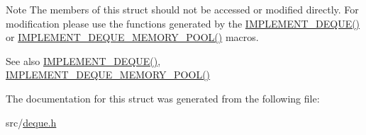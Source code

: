 \begin{DoxyNote}{Note}
The members of this struct should not be accessed or modified directly. For modification please use the functions generated by the \hyperlink{deque_8h_a71fbe309fa88eb8d294b141f33d81233}{I\+M\+P\+L\+E\+M\+E\+N\+T\+\_\+\+D\+E\+Q\+U\+E()} or \hyperlink{deque_8h_af0b4f70c946b30e8828eaa413e65819b}{I\+M\+P\+L\+E\+M\+E\+N\+T\+\_\+\+D\+E\+Q\+U\+E\+\_\+\+M\+E\+M\+O\+R\+Y\+\_\+\+P\+O\+O\+L()} macros.
\end{DoxyNote}
\begin{DoxySeeAlso}{See also}
\hyperlink{deque_8h_a71fbe309fa88eb8d294b141f33d81233}{I\+M\+P\+L\+E\+M\+E\+N\+T\+\_\+\+D\+E\+Q\+U\+E()}, \hyperlink{deque_8h_af0b4f70c946b30e8828eaa413e65819b}{I\+M\+P\+L\+E\+M\+E\+N\+T\+\_\+\+D\+E\+Q\+U\+E\+\_\+\+M\+E\+M\+O\+R\+Y\+\_\+\+P\+O\+O\+L()} 
\end{DoxySeeAlso}


The documentation for this struct was generated from the following file\+:\begin{DoxyCompactItemize}
\item 
src/\hyperlink{deque_8h}{deque.\+h}\end{DoxyCompactItemize}
